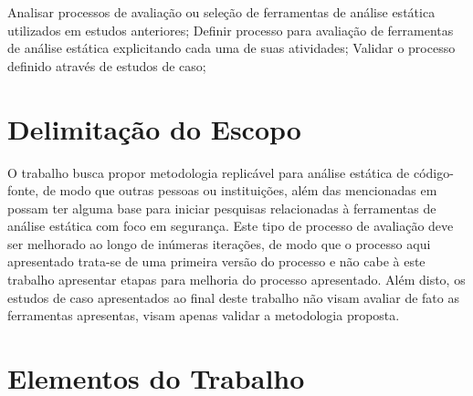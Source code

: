 Analisar processos de avaliação ou seleção de ferramentas de análise estática utilizados em estudos anteriores;
Definir processo para avaliação de ferramentas de análise estática explicitando cada uma de suas atividades;
Validar o processo definido através de estudos de caso;

\section{Delimitação do Escopo}

O trabalho busca propor metodologia replicável para análise estática de código-fonte, de modo que outras pessoas ou instituições, além das mencionadas em  possam ter alguma base para iniciar pesquisas relacionadas à ferramentas de análise estática com foco em segurança. Este tipo de processo de avaliação deve ser melhorado ao longo de inúmeras iterações, de modo que o processo aqui apresentado trata-se de uma primeira versão do processo e não cabe à este trabalho apresentar etapas para melhoria do processo apresentado. Além disto, os estudos de caso apresentados ao final deste trabalho não visam avaliar de fato as ferramentas apresentas, visam apenas validar a metodologia proposta.

\section{Elementos do Trabalho}


